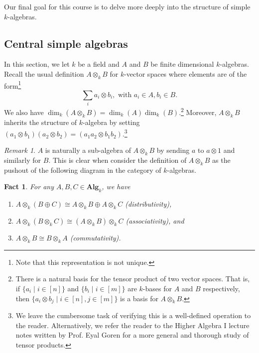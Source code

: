 \documentclass{tufte-handout} %
\newtheorem{fact}[thm]{Fact}
\theoremstyle{definition}
\theoremstyle{remark}
\newtheorem{rem}[thm]{Remark}
\begin{document}
Our final goal for this course is to delve more deeply into the structure of simple $k$-algebras.

\subsection{Central simple algebras}
In this section, we let $k$ be a field and $A$ and $B$ be finite dimensional $k$-algebras. Recall the usual definition $A \otimes_k B$ for $k$-vector spaces where elements are of the form\footnote{Note that this representation is not unique.}\[\sum_{i} a_i \otimes b_i, \text{ with } a_i \in A, b_i \in B.\] We also have $\dim_k(A\otimes_k B) = \dim_k(A)\dim_k(B)$.\footnote{There is a natural basis for the tensor product of two vector spaces. That is, if $\{a_i \mid i \in [n]\}$ and $\{b_i \mid i \in [m]\}$ are $k$-bases for $A$ and $B$ respectively, then $\{a_i\otimes b_j \mid i\in [n], j\in[m]\}$ is a basis for $A \otimes_k B$.} Moreover, $A\otimes_k B$ inherits the structure of $k$-algebra by setting $(a_1 \otimes b_1)(a_2 \otimes b_2)= (a_1a_2 \otimes b_1b_2).$\footnote{We leave the cumbersome task of verifying this is a well-defined operation to the reader. Alternatively, we refer the reader to the Higher Algebra I lecture notes written by Prof. Eyal Goren for a more general and thorough study of tensor products.}

\begin{rem}
	$A$ is naturally a sub-algebra of $A \otimes_k B$ by sending $a$ to $a\otimes 1$ and similarly for $B$. This is clear when consider the definition of $A \otimes_k B$ as the pushout of the following diagram in the category of $k$-algebras.
	\begin{figure}[h]
		\centering
	\end{figure}
\end{rem}
\begin{fact}\label{factstensor}
	For any $A, B, C \in \textbf{Alg}_k$, we have
	\begin{enumerate}
		\item $A \otimes_k (B \oplus C) \cong A\otimes_k B \oplus A \otimes_k C$ (distributivity),
		\item $A \otimes_k (B \otimes_k C) \cong (A \otimes_k B) \otimes_k C$ (associativity), and
		\item $A \otimes_k B \cong B \otimes_k A$ (commutativity).
	\end{enumerate}
\end{fact}
\end{document}

